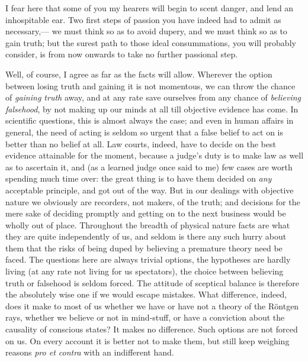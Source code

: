 \documentclass[12pt]{article}
\begin{document}
I fear here that some of you my hearers will begin to scent danger, and lend an inhospitable ear.  Two first steps of passion you have indeed had to admit as necessary,--- we must think so as to avoid dupery, and we must think so as to gain truth; but the surest path to those ideal consummations, you will probably consider, is from now onwards to take no further passional step.

Well, of course, I agree as far as the facts will allow.  Wherever the option between losing truth and gaining it is not momentous, we can throw the  chance of \emph{gaining truth} away, and at any rate save ourselves from any chance of \emph{believing falsehood}, by not making up our minds at all till objective evidence has come.  In scientific questions, this is almost always the case; and even in human affairs in general, the need of acting is seldom so urgent that a false belief to act on is better than no belief at all.  Law courts, indeed, have to decide on the best evidence attainable for the moment, because a judge's duty is to make law as well as to ascertain it, and (as a learned judge once said to me) few cases are worth spending much time over: the great thing is to have them decided on \emph{any} acceptable principle, and got out of the way.  But in our dealings with objective nature we obviously are recorders, not makers, of the truth; and decisions for the mere sake of deciding promptly and getting on to the next business would be wholly out of place.  Throughout the breadth of physical nature facts are what they are quite independently of us, and seldom is there any such hurry about them that the risks of being duped by believing a premature theory need be faced.  The questions here are always trivial options, the hypotheses are hardly living (at any rate not living for us spectators), the choice between believing truth or falsehood is seldom forced.  The attitude of sceptical balance is therefore the absolutely wise one if we would escape mistakes.  What difference, indeed, does it make to most of us whether we have or have not a theory of the R\"{o}ntgen rays, whether we believe or not in mind-stuff, or have a conviction about the causality of conscious states?  It makes no difference.  Such options are not forced on us. On every account it is better not to make them, but still keep weighing reasons \emph{pro et contra} with an indifferent hand.

\end{document}
